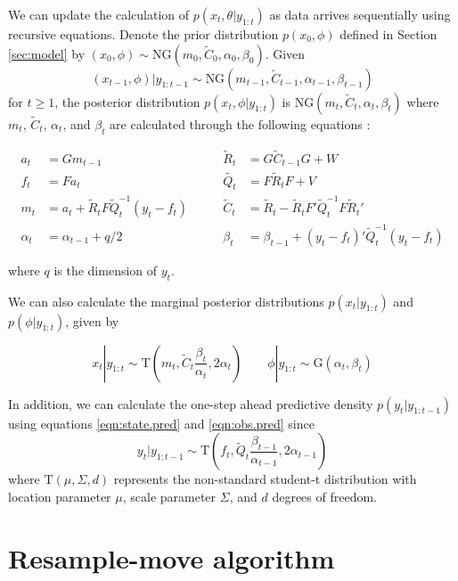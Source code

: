 \documentclass{article}
\begin{document}
We can update the calculation of $p(x_t,\theta|y_{1:t})$ as data arrives sequentially using recursive equations. Denote the prior distribution $p(x_0, \phi)$ defined in Section \ref{sec:model} by $(x_0, \phi) \sim \mbox{NG}(m_0, \tilde{C}_0, \alpha_0, \beta_0)$. Given \[(x_{t-1},\phi)|y_{1:t-1} \sim \mbox{NG}(m_{t-1},\tilde{C}_{t-1}, \alpha_{t-1}, \beta_{t-1})\]
\noindent for $t \ge 1$, the posterior distribution $p(x_t,\phi|y_{1:t})$ is $\mbox{NG}(m_t,\tilde{C}_t,\alpha_t,\beta_t)$ where $m_t$, $\tilde{C}_t$, $\alpha_t$, and $\beta_t$ are calculated through the following equations \citep{petris2009dynamic}:

\begin{align}
a_t &= Gm_{t-1} &\qquad \tilde{R}_t &= G\tilde{C}_{t-1}G + W \label{eqn:state.pred} \\
f_t &= Fa_t &\qquad \tilde{Q_t} &= F\tilde{R}_tF + V \label{eqn:obs.pred} \\
m_t &= a_t + \tilde{R}_tF\tilde{Q}_t^{-1}(y_t-f_t) &\qquad \tilde{C}_t &= \tilde{R}_t - \tilde{R}_tF'\tilde{Q}_t^{-1}F\tilde{R}_t' \\
\alpha_t &= \alpha_{t-1} + q / 2 &\qquad \beta_t &= \beta_{t-1} + (y_t-f_t)'\tilde{Q}_t^{-1}(y_t-f_t)
\end{align}

\noindent where $q$ is the dimension of $y_t$.

We can also calculate the marginal posterior distributions $p(x_t|y_{1:t})$ and $p(\phi|y_{1:t})$, given by

\begin{equation}
x_t|y_{1:t} \sim \mbox{T}(m_t,\tilde{C}_t \frac{\beta_t}{\alpha_t},2\alpha_t) \qquad \phi|y_{1:t} \sim \mbox{G}(\alpha_t,\beta_t) \label{eqn:margpost}
\end{equation}

In addition, we can calculate the one-step ahead predictive density $p(y_t|y_{1:t-1})$ using equations \eqref{eqn:state.pred} and \eqref{eqn:obs.pred} since \[y_t|y_{1:t-1} \sim \mbox{T}(f_t,\tilde{Q}_t \frac{\beta_{t-1}}{\alpha_{t-1}},2\alpha_{t-1})\]
\noindent where $\mbox{T}(\mu,\Sigma,d)$ represents the non-standard student-t distribution with location parameter $\mu$, scale parameter $\Sigma$, and $d$ degrees of freedom.

\section{Resample-move algorithm} \label{sec:rm}
\end{document}
